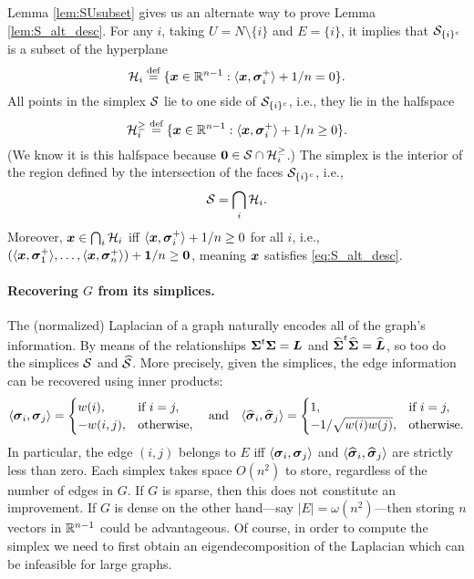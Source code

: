 Lemma \ref{lem:SUsubset} gives us an alternate way to prove Lemma \ref{lem:S_alt_desc}. For any $i$,  taking $U=N\setminus \{i\}$ and $E=\{i\}$, it implies that $\mathcal{S}_{\{i\}^c}$ is a subset of the hyperplane 
\[ \mathcal{H}_i\overset{\text{def}}{=} \{\vb*{x}\in\mathbb{R}^{n-1}:\langle \vb*{x},\vb*{\sigma}_i^+\rangle+1/n=0\}.\]
All points in the simplex $\mathcal{S}$ lie to one side of $\mathcal{S}_{\{i\}^c}$, i.e., they lie in the halfspace 
\[\mathcal{H}_i^{\geq } \overset{\text{def}}{=} \{\vb*{x}\in\mathbb{R}^{n-1}:\langle \vb*{x},\vb*{\sigma}_i^+\rangle+1/n\geq0\}.\]
(We know it is this halfspace because $\vb{0}\in\mathcal{S}\cap\mathcal{H}_i^{\geq }$.) The simplex is the interior of the region defined by the intersection of the faces $\mathcal{S}_{\{i\}^c}$, i.e.,   
\begin{equation*}
    \mathcal{S}=\bigcap_i \mathcal{H}_i.
\end{equation*}
Moreover, $\vb*{x}\in \bigcap_i\mathcal{H}_i$ iff $\langle \vb*{x},\vb*{\sigma}_i^+\rangle +1/n\geq 0$ for all $i$, i.e., $(\langle \vb*{x},\vb*{\sigma}_1^+\rangle,\dots,\langle \vb*{x},\vb*{\sigma}_n^+\rangle) + \vb{1}/n\geq \vb{0}$, meaning $\vb*{x}$ satisfies \eqref{eq:S_alt_desc}.  




\paragraph{Recovering $G$ from its simplices.}
The (normalized) Laplacian of a graph naturally encodes all of the graph's information. By means of the relationships $\boldsymbol{\Sigma}^t\boldsymbol{\Sigma}=\vb*{L}$ and $\widehat{\boldsymbol{\Sigma}}^t\widehat{\boldsymbol{\Sigma}}=\widehat{\vb*{L}}$, so too do the simplices $\mathcal{S}$ and $\widehat{\mathcal{S}}$. More precisely, given the simplices, the edge information can be recovered using inner products: 
\begin{equation*}
    \langle \vb*{\sigma}_i,\vb*{\sigma}_j\rangle = \begin{cases} w(i),&\text{if }i=j,\\
    -w(i,j),&\text{otherwise},
    \end{cases}\quad \text{and} \quad 
    \langle \widehat{\vb*{\sigma}}_i,\widehat{\vb*{\sigma}}_j\rangle = \begin{cases} 1,&\text{if }i=j,\\
    -1/\sqrt{w(i)w(j)},&\text{otherwise}.
    \end{cases}
\end{equation*}
In particular, the edge $(i,j)$ belongs to $E$ iff $\langle \vb*{\sigma}_i,\vb*{\sigma}_j\rangle$ and $\langle \widehat{\vb*{\sigma}}_i,\widehat{\vb*{\sigma}}_j\rangle$ are strictly less than zero. Each simplex takes space $O(n^2)$ to store, regardless of the number of edges in $G$. If $G$ is sparse, then this does not constitute an improvement. If $G$ is dense on the other hand---say $|E|=\omega(n^2)$---then storing $n$ vectors in $\mathbb{R}^{n-1}$ could be advantageous. Of course, in order to compute the simplex we need to first obtain an eigendecomposition of the Laplacian which can be infeasible for large graphs. 

